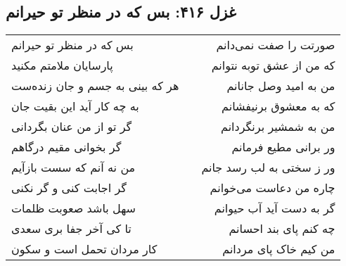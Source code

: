\begin{center}
\section*{غزل ۴۱۶: بس که در منظر تو حیرانم}
\label{sec:416}
\begin{longtable}{l p{0.5cm} r}
بس که در منظر تو حیرانم
&&
صورتت را صفت نمی‌دانم
\\
پارسایان ملامتم مکنید
&&
که من از عشق توبه نتوانم
\\
هر که بینی به جسم و جان زنده‌ست
&&
من به امید وصل جانانم
\\
به چه کار آید این بقیت جان
&&
که به معشوق برنیفشانم
\\
گر تو از من عنان بگردانی
&&
من به شمشیر برنگردانم
\\
گر بخوانی مقیم درگاهم
&&
ور برانی مطیع فرمانم
\\
من نه آنم که سست بازآیم
&&
ور ز سختی به لب رسد جانم
\\
گر اجابت کنی و گر نکنی
&&
چاره من دعاست می‌خوانم
\\
سهل باشد صعوبت ظلمات
&&
گر به دست آید آب حیوانم
\\
تا کی آخر جفا بری سعدی
&&
چه کنم پای بند احسانم
\\
کار مردان تحمل است و سکون
&&
من کیم خاک پای مردانم
\\
\end{longtable}
\end{center}
